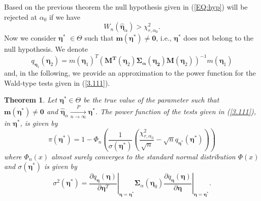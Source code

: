 \documentclass[a4paper]{article}%
\newtheorem{theorem}{Theorem}
\begin{document}
Based on the previous theorem the null hypothesis given in (\ref{EQ:hyp}) will
be rejected at $\alpha_0$ if we have 
\begin{equation}
W_{n}(\widehat{\boldsymbol{\eta}}_{\alpha})>\chi_{r,\alpha_0}^{2}. \label{3.111}%
\end{equation}
Now we consider $\boldsymbol{\eta}^{\ast}$ $\in\Theta$ such that
$\boldsymbol{m}\left(  \boldsymbol{\eta}^{\ast}\right)  \neq\boldsymbol{0}$,
i.e., $\boldsymbol{\eta}^{\ast}$ does not belong to the null hypothesis. We
denote%
\[
q_{\boldsymbol{\eta}_{1}}(\boldsymbol{\eta}_{2})=m\left(  \boldsymbol{\eta
}_{1}\right)  ^{T}\left(  \boldsymbol{\boldsymbol{M}^{T}}\left(
\boldsymbol{\eta}_{2}\right)  \boldsymbol{\boldsymbol{\Sigma}_{\alpha}%
}(\boldsymbol{\boldsymbol{\eta}_{2}})\boldsymbol{M}\left(  \boldsymbol{\eta
}_{2}\right)  \right)  ^{-1}m\left(  \boldsymbol{\eta}_{1}\right)
\]
and, in the following, we provide  an approximation to the power function for the Wald-type tests
given in (\ref{3.111}).

\begin{theorem}
Let $\boldsymbol{\eta}^{\ast}\in\Theta$ be the true value of the parameter
such that $\boldsymbol{m}\left(  \boldsymbol{\eta}^{\ast}\right)
\neq\boldsymbol{0}$ and $\widehat{\boldsymbol{\eta}}_{\alpha}%
\underset{n\rightarrow\infty}{\overset{P}{\longrightarrow}}\boldsymbol{\eta
}^{\ast}$. The power function of the tests given in (\ref{3.111}), in
$\boldsymbol{\eta}^{\ast}$, is given by
\begin{equation}
\pi\left(  \boldsymbol{\eta}^{\ast}\right)  =1-\Phi_{n}\left(  \frac{1}%
{\sigma\left(  \boldsymbol{\eta}^{\ast}\right)  }\left(  \frac{\chi_{r,\alpha_0
}^{2}}{\sqrt{n}}-\sqrt{n}q_{\boldsymbol{\eta}^{\ast}}(\boldsymbol{\eta}^{\ast
})\right)  \right)  \label{3.112}%
\end{equation}
where $\Phi_{n}\left(  x\right)  $ almost surely converges to the standard normal
distribution $\Phi\left(  x\right)  $ and $\sigma\left(  \boldsymbol{\eta
}^{\ast}\right)  $ is given by
\[
\sigma^{2}\left(  \boldsymbol{\eta}^{\ast}\right)  =\left.  \frac{\partial
q_{\boldsymbol{\eta}}(\boldsymbol{\eta})}{\partial\boldsymbol{\eta}^{T}%
}\right\vert _{\boldsymbol{\eta}=\boldsymbol{\eta}^{\ast}}\boldsymbol{\Sigma
}_{\alpha}\left(  \boldsymbol{\eta}_{0}\right)  \left.  \frac{\partial
q_{\boldsymbol{\eta}}(\boldsymbol{\eta})}{\partial\boldsymbol{\eta}%
}\right\vert _{\boldsymbol{\eta}=\boldsymbol{\eta}^{\ast}}.
\]
\label{THM:power_approx}
\end{theorem}
\end{document}
